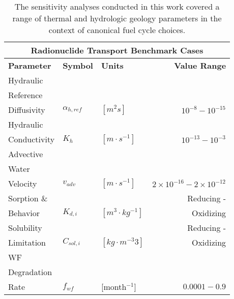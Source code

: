 
\begin{table}[ht!]
\centering
\footnotesize{
  \begin{tabularx}{\textwidth}{|X|l|l|r|}
\multicolumn{4}{c}{\textbf{Radionuclide Transport Benchmark Cases}}\\
\hline
\textbf{Parameter} & \textbf{Symbol} & \textbf{Units} & \textbf{Value Range} \\
\hline
Hydraulic & & & \\
Reference & & & \\
Diffusivity& $\alpha_{h,ref}$& $[m^2s]$ & $10^{-8} - 10^{-15}$ \\
\hline
Hydraulic & & & \\
Conductivity& $K_{h}$& $[m \cdot s^{-1}]$ & $10^{-13} - 10^{-3}$ \\
\hline
Advective  & & & \\
Water & & & \\
Velocity & $v_{adv}$ & $[m\cdot s^{-1}]$ & $2\times10^{-16}-2\times10^{-12}$ \\
\hline
Sorption \& & & & Reducing - \\
Behavior & $K_{d,i}$& $[m^3\cdot kg^{-1}]$ & Oxidizing \\
\hline
Solubility &  & & Reducing -\\
Limitation & $C_{sol,i}$ & $[kg\cdot m^{-3}3]$& Oxidizing \\
\hline
WF& & & \\
Degradation& & & \\
Rate& $f_{wf}$ & [month$^{-1}$]& $0.0001-0.9$ \\
\hline
\end{tabularx}
\caption{The sensitivity analyses conducted in this work covered a range of 
thermal and hydrologic geology parameters in the context of canonical fuel cycle choices.}
}
\label{tab:nuclide_bench_tab}
\end{table}

